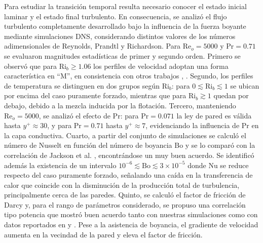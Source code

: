 Para estudiar la transición temporal resulta necesario conocer el estado inicial laminar y el estado final turbulento. En consecuencia, se analizó el flujo turbulento completamente desarrollado bajo la influencia de la fuerza boyante mediante simulaciones DNS, considerando distintos valores de los números adimensionales de Reynolds, Prandtl y Richardson. Para $\text{Re}_o=5000$ y $\text{Pr}=0\text{.}71$ se evaluaron magnitudes estadísticas de primer y segundo orden. Primero se observó que para $\text{Ri}_b \geq 1\text{.}06$ los perfiles de velocidad adoptan una forma \linebreak característica en ``M'', en consistencia con otros trabajos \cite{you2003direct}, \cite{zhou2024direct}. Segundo, los perfiles de temperatura se distinguen en dos grupos según $\text{Ri}_b$: para $0 \lesssim \text{Ri}_b \lesssim 1$ se ubican por encima del caso puramente forzado, mientras que para $\text{Ri}_b \gtrsim 1$ quedan por debajo, debido a la mezcla inducida por la flotación. Tercero, manteniendo $\text{Re}_o=5000$, se analizó el efecto de $\text{Pr}$: para $\text{Pr}=0\text{.}071$ la ley de pared \cite{kawamura1998dns} es válida hasta $y^+ \approx 30$, y para $\text{Pr}=0\text{.}71$ hasta $y^+ \approx 7$, evidenciando la influencia de $\text{Pr}$ en la capa conductiva. Cuarto, a partir del conjunto de simulaciones se calculó el número de Nusselt en función del número de boyancia Bo y se lo comparó con la correlación de Jackson et al. \cite{jackson1989studies}, encontrándose un muy buen acuerdo. Se identificó además la existencia de un intervalo $10^{-6} \lesssim \text{Bo} \lesssim 3 \times 10^{-5}$ donde Nu se reduce respecto del caso puramente forzado, señalando una caída en la transferencia de calor que coincide con la disminución de la producción total de turbulencia, principalmente cerca de las paredes. Quinto, se calculó el factor de fricción de Darcy y, para el rango de parámetros considerado, se propuso una correlación tipo potencia que mostró buen acuerdo tanto con nuestras simulaciones como con datos reportados en \cite{you2003direct} y \cite{parlatan1996buoyancy}. Pese a la asistencia de boyancia, el gradiente de velocidad aumenta en la vecindad de la pared y eleva el factor de fricción.


